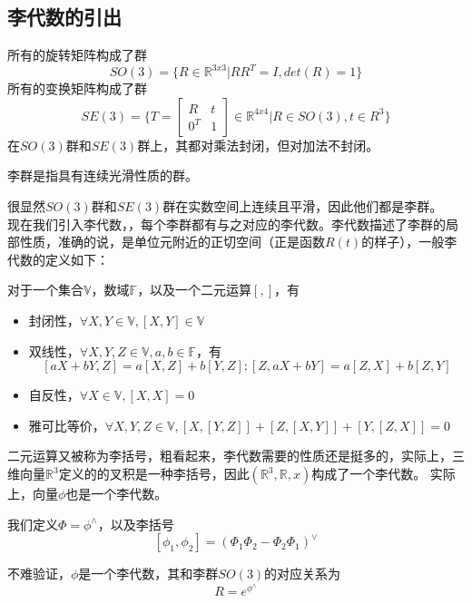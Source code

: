 \subsection{李代数的引出}
所有的旋转矩阵构成了群
\[
    SO(3) = \{R \in \mathbb{R}^{3x3} | RR^T = I, det(R) = 1\}
\]
所有的变换矩阵构成了群
\[
    SE(3) = \{T = \begin{bmatrix} R & t \\ 0^T & 1\end{bmatrix} \in \mathbb{R}^{4x4} | R \in SO(3), t \in R^3\}
\]
在\(SO(3)\)群和\(SE(3)\)群上，其都对乘法封闭，但对加法不封闭。
\begin{definition}
    李群是指具有连续光滑性质的群。
\end{definition}
很显然\(SO(3)\)群和\(SE(3)\)群在实数空间上连续且平滑，因此他们都是李群。\\
现在我们引入李代数，，每个李群都有与之对应的李代数。李代数描述了李群的局部性质，准确的说，是单位元附近的正切空间（正是函数\(R(t)\)的样子），一般李代数的定义如下：
\begin{definition}
    对于一个集合\(\mathbb{V}\)，数域\(\mathbb{F}\)，以及一个二元运算\([,]\)，有
    \begin{itemize}
        \item 封闭性，\(\forall X, Y \in \mathbb{V}, [X, Y] \in \mathbb{V}\)
        \item 双线性，\(\forall X, Y, Z \in \mathbb{V}, a, b \in \mathbb{F}\)，有
              \[
                  [aX + bY, Z] = a[X, Z] + b[Y, Z]; [Z, aX + bY] = a[Z, X] + b[Z, Y]
              \]
        \item 自反性，\(\forall X \in \mathbb{V}, [X, X]=0\)
        \item 雅可比等价，\(\forall X, Y, Z \in \mathbb{V}, [X, [Y, Z]] + [Z, [X, Y]] + [Y, [Z, X]] = 0\)
    \end{itemize}
\end{definition}
二元运算又被称为李括号，粗看起来，李代数需要的性质还是挺多的，实际上，三维向量\(\mathbb{R}^3\)定义的的叉积是一种李括号，因此\((\mathbb{R}^3, \mathbb{R}, x)\)构成了一个李代数。{\color{red} 实际上，向量\(\phi\)也是一个李代数。}
\begin{definition}
    我们定义\(\Phi = \phi^\wedge\)，以及李括号
    \[
        [\phi_1, \phi_2] = (\Phi_1\Phi_2-\Phi_2\Phi_1)^\vee
    \]
\end{definition}
不难验证，\(\phi\)是一个李代数，其和李群\(SO(3)\)的对应关系为
\[
    R = e^{\phi^\wedge}
\]


